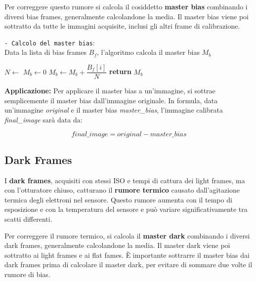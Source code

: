 Per correggere questo rumore si calcola il cosiddetto \textbf{master bias} combinando i diversi bias frames, generalmente calcolandone la media. Il master bias viene poi sottratto da tutte le immagini acquisite, inclusi gli altri frame di calibrazione.

\begin{algorithm}[H]
    \caption{\texttt{- Calcolo del master bias}:\\ Data la lista di bias frames $B_f$, l'algoritmo calcola il master bias $M_b$} \label{alg:bias}
    \begin{algorithmic}[1]
            \State $N \gets$ 
            \State $M_b \gets 0$
                \State $M_b \gets M_b + \dfrac{B_f[i]}N$ 
            \EndFor
            \State \textbf{return} $M_b$
        \EndFunction
    \end{algorithmic}
\end{algorithm}

\textbf{Applicazione:} Per applicare il master bias a un'immagine, si sottrae semplicemente il master bias dall'immagine originale. In formula, data un'immagine \textit{original} e il master bias \textit{master\_bias}, l'immagine calibrata \textit{final\_image} sarà data da:

$$
    final\_image = original - master\_bias
$$

\subsection{Dark Frames} \label{subsec:dark}

I \textbf{dark frames}, acquisiti con stessi ISO e tempi di cattura dei light frames, ma con l'otturatore chiuso, catturano il \textbf{rumore termico} causato dall'agitazione termica degli elettroni nel sensore. Questo rumore aumenta con il tempo di esposizione e con la temperatura del sensore e può variare significativamente tra scatti differenti.

Per correggere il rumore termico, si calcola il \textbf{master dark} combinando i diversi dark frames, generalmente calcolandone la media. Il master dark viene poi sottratto ai light frames e ai flat fames. È importante sottrarre il master bias dai dark frames prima di calcolare il master dark, per evitare di sommare due volte il rumore di bias.

